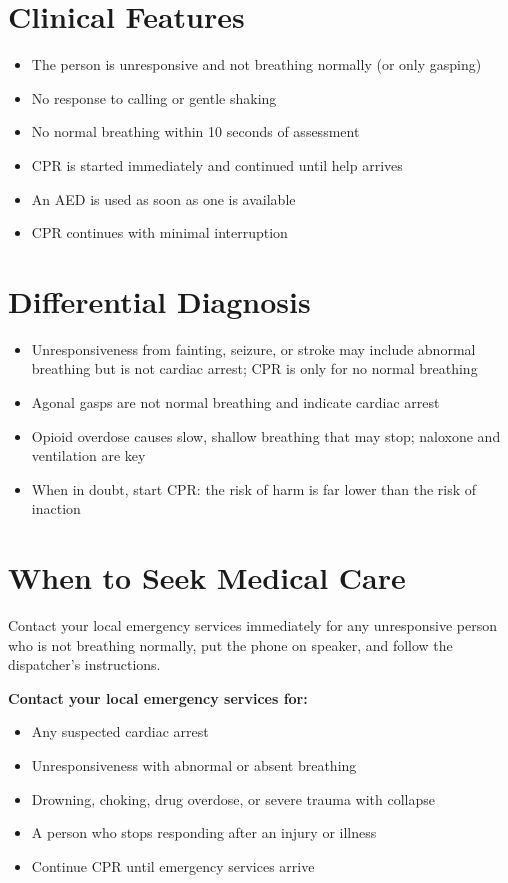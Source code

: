 \section*{Clinical Features}
\begin{itemize}
    \item The person is unresponsive and not breathing normally (or only gasping)
    \item No response to calling or gentle shaking
    \item No normal breathing within 10 seconds of assessment
    \item CPR is started immediately and continued until help arrives
    \item An AED is used as soon as one is available
    \item CPR continues with minimal interruption
\end{itemize}

\section*{Differential Diagnosis}
\begin{itemize}
    \item Unresponsiveness from fainting, seizure, or stroke may include abnormal breathing but is not cardiac arrest; CPR is only for no normal breathing
    \item Agonal gasps are not normal breathing and indicate cardiac arrest
    \item Opioid overdose causes slow, shallow breathing that may stop; naloxone and ventilation are key
    \item When in doubt, start CPR: the risk of harm is far lower than the risk of inaction
\end{itemize}

\section*{When to Seek Medical Care}
Contact your local emergency services immediately for any unresponsive person who is not breathing normally, put the phone on speaker, and follow the dispatcher's instructions.

\textbf{Contact your local emergency services for:}
\begin{itemize}
    \item Any suspected cardiac arrest
    \item Unresponsiveness with abnormal or absent breathing
    \item Drowning, choking, drug overdose, or severe trauma with collapse
    \item A person who stops responding after an injury or illness
    \item Continue CPR until emergency services arrive
\end{itemize}

